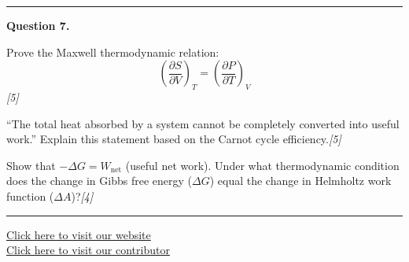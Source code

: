 \documentclass[11pt,a4paper]{article}
\newcommand{\pts}[1]{\hfill   \textit{[#1]}}
\begin{document}
\medskip\rule{\linewidth}{0.2pt}\medskip




\noindent   \textbf{Question 7.}

\begin{parts}
  \item Prove the Maxwell thermodynamic relation:
  \[
    \left( \frac{\partial S}{\partial V} \right)_T = \left( \frac{\partial P}{\partial T} \right)_V
  \]\pts{5}
  \item ``The total heat absorbed by a system cannot be completely converted into useful work.'' Explain this statement based on the Carnot cycle efficiency.\pts{5}
  \item Show that $-\Delta G = W_{ \text{net}}$ (useful net work). Under what thermodynamic condition does the change in Gibbs free energy ($\Delta G$) equal the change in Helmholtz work function ($\Delta A$)?\pts{4}
\end{parts}

\vfill
\rule{\linewidth}{0.4pt}

\begin{center}\small
\href{https://bhu-exam.vercel.app/}{Click here to visit our website}\\[4pt]
\href{https://me-aryan.vercel.app/}{Click here to visit our contributor}
\end{center}
\end{document}
